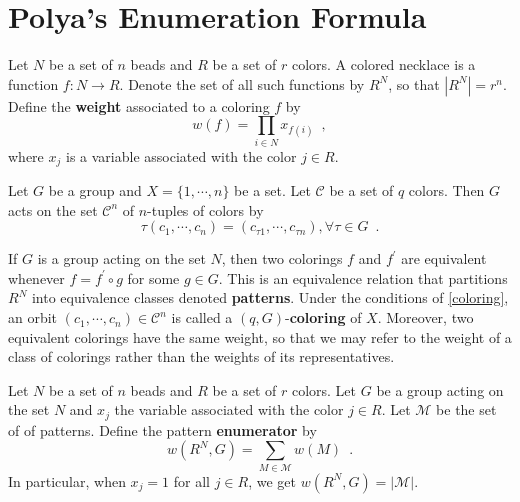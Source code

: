 
\chapter{Polya's Enumeration Formula}

\begin{definition}
	\cite[85]{Aigner2007}
	Let $N$ be a set of $n$ beads and $R$ be a set of $r$ colors. A colored necklace is
	a function $f : N \to R$. Denote the set of all such functions by $R^N$, so that
	$|R^N| = r^n$. Define the \textbf{weight} associated to a coloring $f$ by
	\begin{equation}
		w(f) = \prod_{i \in N} x_{f(i)} \enspace,
	\end{equation}
	where $x_j$ is a variable associated with the color $j \in R$.
\end{definition}

\begin{proposition}
	\label{coloring}
	\cite[110]{Rotman1967}
	Let $G$ be a group and $X = \{ 1, \cdots, n \}$ be a set. Let $\mathcal{C}$ be a set
	of $q$ colors. Then $G$ acts on the set $\mathcal{C}^n$ of $n$-tuples of colors by
	\begin{equation}
		\tau(c_1, \cdots, c_n) = (c_{\tau 1}, \cdots, c_{\tau n}),
		\forall \tau \in G \enspace.
	\end{equation}
\end{proposition}

\begin{proposition}
	\cite[85]{Aigner2007}
	\cite[110]{Rotman1967}
	If $G$ is a group acting on the set $N$, then two colorings $f$ and $f^\prime$
	are equivalent whenever $f = f^\prime \circ g$ for some $g \in G$. This is an
	equivalence relation that partitions $R^N$ into equivalence classes denoted
	\textbf{patterns}. Under the conditions of \ref{coloring}, an orbit
	$(c_1, \cdots, c_n) \in \mathcal{C}^n$ is called a $(q, G)$-\textbf{coloring} of $X$.
	Moreover, two equivalent colorings have the same weight, so that we may refer to
	the weight of a class of colorings rather than the weights of its representatives.
\end{proposition}

\begin{definition}
	\cite[85]{Aigner2007}
	Let $N$ be a set of $n$ beads and $R$ be a set of $r$ colors. Let $G$ be a group acting
	on the set $N$ and $x_j$ the variable associated with the color $j \in R$. Let
	$\mathcal{M}$ be the set of of patterns. Define the pattern \textbf{enumerator} by
	\begin{equation}
		w(R^N, G) = \sum_{M \in \mathcal{M}} w(M) \enspace.
	\end{equation}
	In particular, when $x_j = 1$ for all $j \in R$, we get $w(R^N, G) = |\mathcal{M}|$.
\end{definition}

